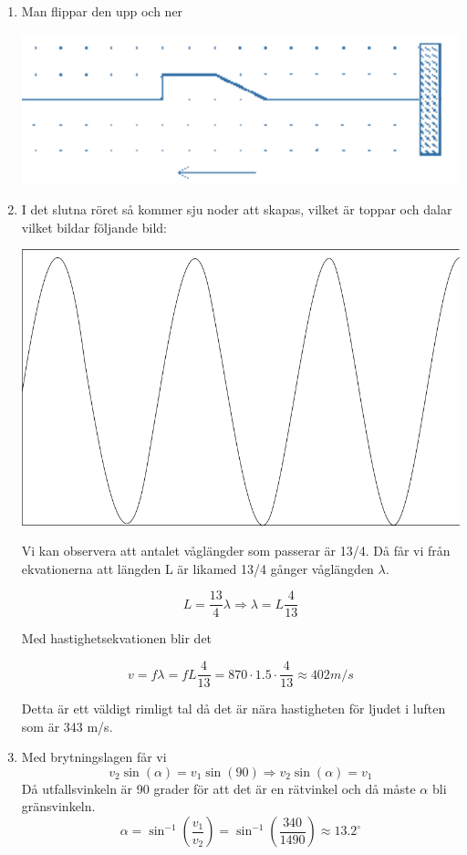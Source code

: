 \documentclass[a4paper,12pt]{article}
\begin{document}
\begin{enumerate}
    \item Man flippar den upp och ner
    
    \includegraphics{Figur 1.png}
    
    \item 
    I det slutna röret så kommer sju noder att skapas,
    vilket är toppar och dalar vilket bildar följande bild:
    \begin{center}
        \includegraphics[scale=0.5]{Figur 2.png}
    \end{center}

    Vi kan observera att antalet våglängder som passerar
    är 13/4. Då får vi från ekvationerna att längden L är 
    likamed 13/4 gånger våglängden $\lambda$.

    $$L=\frac{13}{4}\lambda \Rightarrow \lambda=L\frac{4}{13}$$

    Med hastighetsekvationen blir det 

    $$v=f\lambda=fL\frac{4}{13}=870\cdot 1.5\cdot \frac{4}{13}\approx 402m/s$$

    Detta är ett väldigt rimligt tal då det är nära hastigheten 
    för ljudet i luften som är 343 m/s.
    
    \item Med brytningslagen får vi
    $$v_2\sin(\alpha)=v_1\sin(90)\Rightarrow v_2\sin(\alpha)=v_1$$
    Då utfallsvinkeln är 90 grader för att det är en rätvinkel
    och då måste $\alpha$ bli gränsvinkeln. 
    $$\alpha = \sin^{-1}(\frac{v_1}{v_2})=\sin^{-1}(\frac{340}{1490})\approx 13.2^\circ$$


\end{enumerate}
\end{document}

